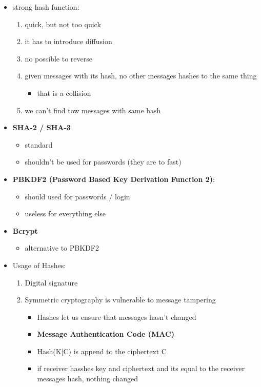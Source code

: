 \documentclass[11pt,twoside,landscape]{article}
\begin{document}
\begin{multicols}{4}
\begin{itemize}
\item strong hash function:
\begin{enumerate}
\item quick, but not too quick
\item it has to introduce diffusion
\item no possible to reverse
\item given messages with its hash, no other messages hashes to the same thing
\begin{itemize}
\item that is a collision
\end{itemize}
\item we can't find tow messages with same hash
\end{enumerate}
\end{itemize}


\begin{itemize}
\item \textbf{SHA-2 / SHA-3}
\begin{itemize}
\item standard
\item shouldn't be used for passwords (they are to fast)
\end{itemize}

\item \textbf{PBKDF2 (Password Based Key Derivation Function 2)}:
\begin{itemize}
\item should used for passwords / login
\item useless for everything else
\end{itemize}
\item \textbf{Bcrypt}
\begin{itemize}
\item alternative to PBKDF2
\end{itemize}
\end{itemize}


\begin{itemize}
\item Usage of Hashes:
\begin{enumerate}
\item Digital signature
\item Symmetric cryptography is vulnerable to message tampering
\begin{itemize}
\item Hashes let us ensure that messages hasn't changed
\item \textbf{Message Authentication Code (MAC)}
\item Hash(K|C) is append to the ciphertext C
\item if receiver hasshes key and ciphertext and its equal to the receiver messages hash, nothing changed
\end{itemize}
\end{enumerate}


\end{itemize}
\end{multicols}
\end{document}
